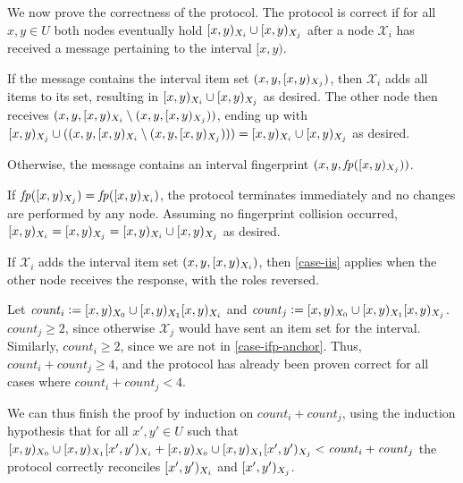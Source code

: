 \newcommand{\intcount}[1]{\mathit{count}_{#1}}

We now prove the correctness of the protocol. The protocol is correct if for all $x, y \in U$ both nodes eventually hold $[{x},{y})_{X_i} \cup [{x},{y})_{X_j}$ after a node $\mathcal{X}_i$ has received a message pertaining to the interval $[x, y)$.

\begin{caselist}
 \label{case-iis}  If the message contains the interval item set $({x}, {y}, [{x},{y})_{X_j})$, then $\mathcal{X}_i$ adds all items to its set, resulting in $[{x},{y})_{X_i} \cup [{x},{y})_{X_j}$ as desired. The other node then receives $({x}, {y}, {[{x},{y})_{X_i} \setminus ({x}, {y}, [{x},{y})_{X_j})})$, ending up with $[{x},{y})_{X_j} \cup (({x}, {y}, {[{x},{y})_{X_i} \setminus ({x}, {y}, [{x},{y})_{X_j})})) = [{x},{y})_{X_i} \cup [{x},{y})_{X_j}$ as desired.

 \label{case-ifp} Otherwise, the message contains an interval fingerprint $({x}, {y}, {\mathit{fp}([{x},{y})_{X_j})})$.

\begin{caselist}
 If $\mathit{fp}([{x},{y})_{X_j}) = \mathit{fp}([{x},{y})_{X_i})$, the protocol terminates immediately and no changes are performed by any node. Assuming no fingerprint collision occurred, $[{x},{y})_{X_i} = [{x},{y})_{X_j} = [{x},{y})_{X_i} \cup [{x},{y})_{X_j}$ as desired.

 \label{case-ifp-anchor} If $\mathcal{X}_i$ adds the interval item set $({x}, {y}, [{x},{y})_{X_i})$, then \cref{case-iis} applies when the other node receives the response, with the roles reversed.

\case[Recurse] Let $\intcount{i} \defeq \abs{\interval{x}{y}{X_i}}$ and $\intcount{j} \defeq \abs{\interval{x}{y}{X_j}}$. $\intcount{j} \geq 2$, since otherwise $\mathcal{X}_j$ would have sent an item set for the interval. Similarly, $\intcount{i} \geq 2$, since we are not in \cref{case-ifp-anchor}. Thus, $\intcount{i} + \intcount{j} \geq 4$, and the protocol has already been proven correct for all cases where $\intcount{i} + \intcount{j} < 4$. 

We can thus finish the proof by induction on $\intcount{i} + \intcount{j}$, using the induction hypothesis that for all $x', y' \in U$ such that $\abs{\interval{x'}{y'}{X_i}} + \abs{\interval{x'}{y'}{X_j}} < \intcount{i} + \intcount{j}$ the protocol correctly reconciles $[{x'},{y'})_{X_i}$ and $[{x'},{y'})_{X_j}$.


\end{caselist}
\end{caselist}
